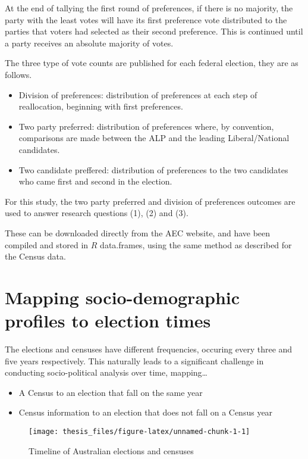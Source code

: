 \documentclass{monashthesis}
\theoremstyle{definition}
\theoremstyle{definition}
\theoremstyle{definition}
\theoremstyle{remark}
\begin{document}
At the end of tallying the first round of preferences, if there is no
majority, the party with the least votes will have its first preference
vote distributed to the parties that voters had selected as their second
preference. This is continued until a party receives an absolute
majority of votes.

The three type of vote counts are published for each federal election,
they are as follows.

\begin{itemize}
\item
  Division of preferences: distribution of preferences at each step of
  reallocation, beginning with first preferences.
\item
  Two party preferred: distribution of preferences where, by convention,
  comparisons are made between the ALP and the leading Liberal/National
  candidates.
\item
  Two candidate preffered: distribution of preferences to the two
  candidates who came first and second in the election.
\end{itemize}

For this study, the two party preferred and division of preferences
outcomes are used to answer research questions (1), (2) and (3).

These can be downloaded directly from the AEC website, and have been
compiled and stored in \(R\) data.frames, using the same method as
described for the Census data.

\section{Mapping socio-demographic profiles to election
times}\label{mapping-socio-demographic-profiles-to-election-times}

The elections and censuses have different frequencies, occuring every
three and five years respectively. This naturally leads to a significant
challenge in conducting socio-political analysis over time,
mapping\ldots{}

\begin{itemize}
\item
  A Census to an election that fall on the same year
\item
  Census information to an election that does not fall on a Census year
\end{itemize}

\begin{figure}

{\centering \texttt{[image: thesis\_files/figure-latex/unnamed-chunk-1-1]} 

}

\caption{Timeline of Australian elections and censuses}\label{fig:unnamed-chunk-1}
\end{figure}
\end{document}
